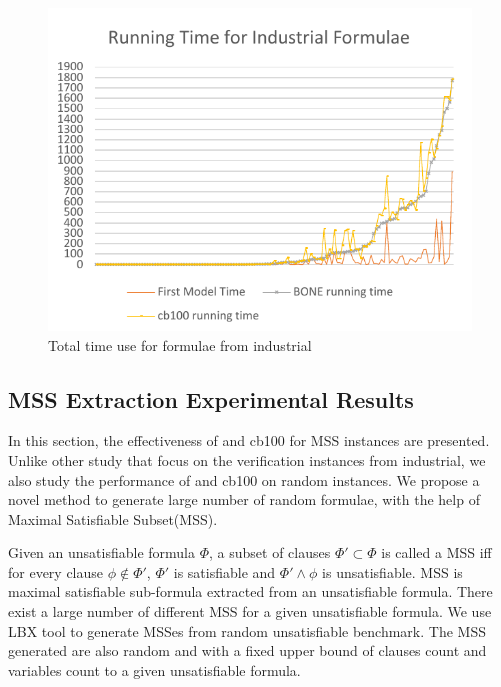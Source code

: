 \begin{figure}
    \centering
    \includegraphics[scale=0.7]{ind2.pdf}
   \caption{Total time use for formulae from industrial}
   \label{fig:ind-time}
\end{figure}

\subsection{MSS Extraction Experimental Results}
In this section, the effectiveness of \tool and cb100 for MSS instances are presented.
Unlike other study that focus on the verification instances from industrial, we also study the performance of \tool and cb100 on random instances.
We propose a novel method to generate large number of random formulae, with the help of Maximal Satisfiable Subset(MSS).

Given an unsatisfiable formula $\Phi$, a subset of clauses $\Phi'\subset\Phi$ is called a MSS iff for every clause $\phi\notin\Phi'$, $\Phi'$ is satisfiable and $\Phi'\wedge\phi$ is unsatisfiable. MSS is maximal satisfiable sub-formula extracted from an unsatisfiable formula. There exist a large number of different MSS for a given unsatisfiable formula. We use LBX tool to generate MSSes from random unsatisfiable benchmark. The MSS generated are also random and with a fixed upper bound of clauses count and variables count to a given unsatisfiable formula.

